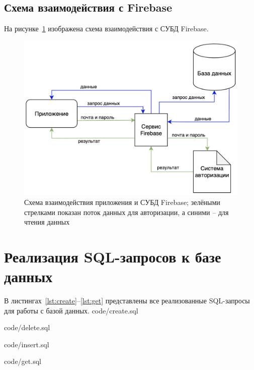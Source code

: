 \subsection*{Схема взаимодействия с Firebase}
На рисунке~\ref{fig:interaction} изображена схема взаимодействия с СУБД Firebase.

\begin{figure}[H]
	\centering
	\includegraphics[height=0.22\textheight]{tools/img/interaction.png}
	\caption{
        Схема взаимодействия приложения и СУБД Firebase; зелёными стрелками показан поток данных для авторизации, а синими -- для чтения данных
    }
	\label{fig:interaction}
\end{figure}

\section{Реализация SQL-запросов к базе данных}
В листингах~\ref{lst:create}--\ref{lst:get} представлены все реализованные SQL-запросы для работы с базой данных.
 {code/create.sql}

 {code/delete.sql}

 {code/insert.sql}

 {code/get.sql}


